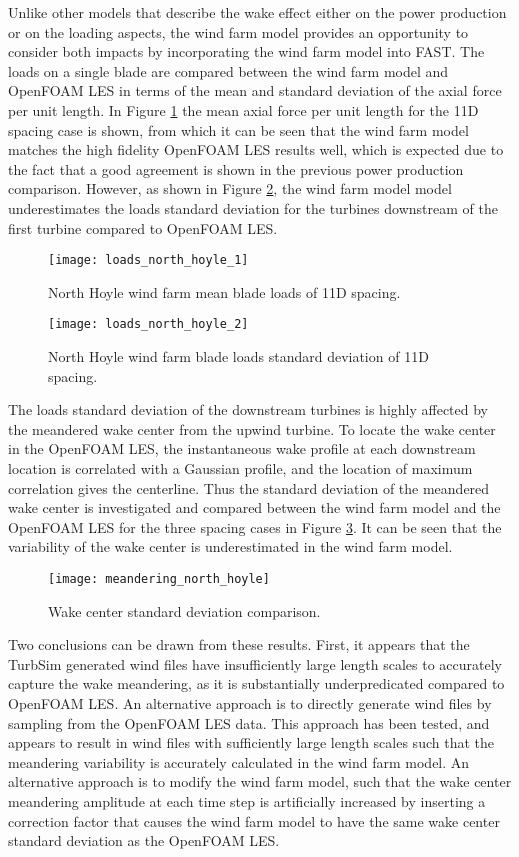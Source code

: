 \documentclass{umthesis}
\begin{document}
Unlike other models that describe the wake effect either on the power production or on the loading aspects, the wind farm model provides an opportunity to consider both impacts by incorporating the wind farm model into FAST. The loads on a single blade are compared between the wind farm model and OpenFOAM LES in terms of the mean and standard deviation of the axial force per unit length. In Figure \ref{fig:loads_north_hoyle_1} the mean axial force per unit length for the 11D spacing case is shown, from which it can be seen that the wind farm model matches the high fidelity OpenFOAM LES results well, which is expected due to the fact that a good agreement is shown in the previous power production comparison. However, as shown in Figure \ref{fig:loads_north_hoyle_2}, the wind farm model model underestimates the loads standard deviation for the turbines downstream of the first turbine compared to OpenFOAM LES.
\begin{figure}
  \centering
  \texttt{[image: loads\_north\_hoyle\_1]}
  \caption{North Hoyle wind farm mean blade loads of 11D spacing.}\label{fig:loads_north_hoyle_1}
\end{figure}

\begin{figure}
  \centering
  \texttt{[image: loads\_north\_hoyle\_2]}
  \caption{North Hoyle wind farm blade loads standard deviation of 11D spacing.}\label{fig:loads_north_hoyle_2}
\end{figure}

The loads standard deviation of the downstream turbines is highly affected by the meandered wake center from the upwind turbine. To locate the wake center in the OpenFOAM LES, the instantaneous wake profile at each downstream location is correlated with a Gaussian profile, and the location of maximum correlation gives the centerline. Thus the standard deviation of the meandered wake center is investigated and compared between the wind farm model and the OpenFOAM LES for the three spacing cases in Figure \ref{fig:meandering_north_hoyle}. It can be seen that the variability of the wake center is underestimated in the wind farm model.
\begin{figure}
  \centering
  \texttt{[image: meandering\_north\_hoyle]}
  \caption{Wake center standard deviation comparison.}\label{fig:meandering_north_hoyle}
\end{figure}

Two conclusions can be drawn from these results. First, it appears that the TurbSim generated wind files have insufficiently large length scales to accurately capture the wake meandering, as it is substantially underpredicated compared to OpenFOAM LES. An alternative approach is to directly generate wind files by sampling from the OpenFOAM LES data. This approach has been tested, and appears to result in wind files with sufficiently large length scales such that the meandering variability is accurately calculated in the wind farm model. An alternative approach is to modify the wind farm model, such that the wake center meandering amplitude at each time step is artificially increased by inserting a correction factor that causes the wind farm model to have the same wake center standard deviation as the OpenFOAM LES.
\end{document}
